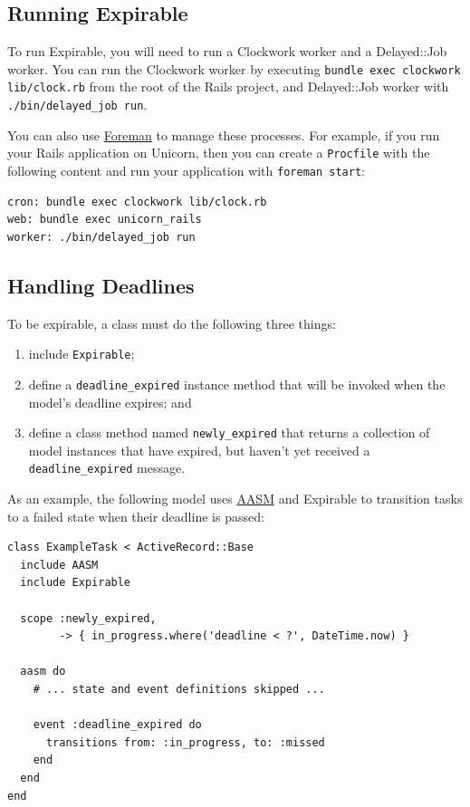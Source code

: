 \documentclass[document.tex]{subfiles}
\begin{document}
\subsection{Running Expirable}

To run Expirable, you will need to run a Clockwork worker and a Delayed::Job worker.
You can run the Clockwork worker by executing {\tt bundle exec clockwork lib/clock.rb}
from the root of the Rails project, and Delayed::Job worker with {\tt ./bin/delayed\_job run}.

You can also use \href{http://blog.daviddollar.org/2011/05/06/introducing-foreman.html}{Foreman}
to manage these processes. For example, if you run your Rails application on Unicorn, then
you can create a {\tt Procfile} with the following content and run your application with {\tt foreman start}:

\begin{lstlisting}
cron: bundle exec clockwork lib/clock.rb
web: bundle exec unicorn_rails
worker: ./bin/delayed_job run

\end{lstlisting}   %

\subsection{Handling Deadlines}

To be expirable, a class must do the following three things:

\begin{enumerate}
\item include {\tt Expirable};
\item define a {\tt deadline\_expired} instance method that will be invoked when the model's deadline expires; and
\item define a class method named {\tt newly\_expired} that returns a collection of model instances that have expired, but haven't yet received a {\tt deadline\_expired} message.
\end{enumerate}

\pagebreak

As an example, the following model uses \href{https://github.com/aasm/aasm}{AASM} and Expirable to transition tasks to a failed state when their deadline is passed:

\begin{lstlisting}
class ExampleTask < ActiveRecord::Base
  include AASM
  include Expirable
  
  scope :newly_expired,
        -> { in_progress.where('deadline < ?', DateTime.now) }

  aasm do
    # ... state and event definitions skipped ...

    event :deadline_expired do
      transitions from: :in_progress, to: :missed
    end
  end
end

\end{lstlisting}   %
\end{document}
